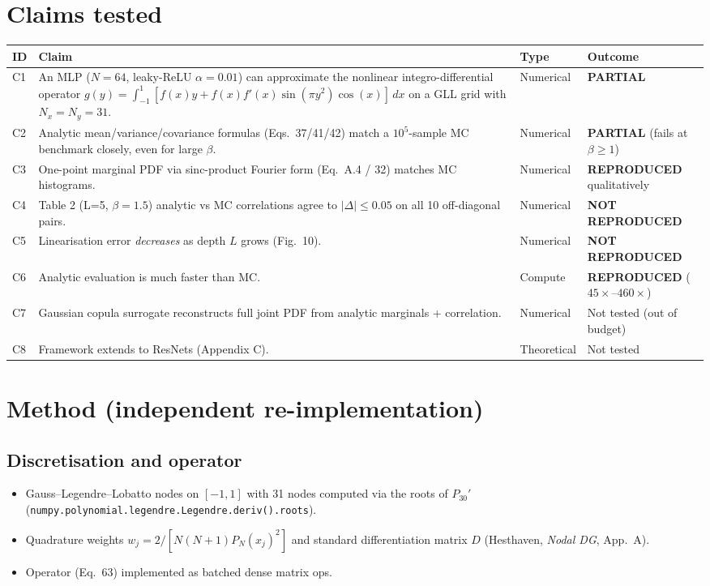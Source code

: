 \documentclass[11pt]{article}
\begin{document}
\section{Claims tested}
\begin{longtable}{p{0.7cm} p{9.5cm} p{2.1cm} p{2.4cm}}
\toprule
ID & Claim & Type & Outcome \\
\midrule
C1 & An MLP ($N{=}64$, leaky-ReLU $\alpha{=}0.01$) can approximate the nonlinear integro-differential operator $g(y) = \int_{-1}^{1}[f(x)y + f(x)f'(x)\sin(\pi y^2)\cos(x)]\,dx$ on a GLL grid with $N_x{=}N_y{=}31$. & Numerical & \textbf{PARTIAL} \\
C2 & Analytic mean/variance/covariance formulas (Eqs.\ 37/41/42) match a $10^5$-sample MC benchmark closely, even for large $\beta$. & Numerical & \textbf{PARTIAL} (fails at $\beta \ge 1$) \\
C3 & One-point marginal PDF via sinc-product Fourier form (Eq.\ A.4 / 32) matches MC histograms. & Numerical & \textbf{REPRODUCED} qualitatively \\
C4 & Table 2 (L=5, $\beta{=}1.5$) analytic vs MC correlations agree to $|\Delta|\le 0.05$ on all 10 off-diagonal pairs. & Numerical & \textbf{NOT REPRODUCED} \\
C5 & Linearisation error \emph{decreases} as depth $L$ grows (Fig.\ 10). & Numerical & \textbf{NOT REPRODUCED} \\
C6 & Analytic evaluation is much faster than MC. & Compute & \textbf{REPRODUCED} ($45\times$--$460\times$) \\
C7 & Gaussian copula surrogate reconstructs full joint PDF from analytic marginals + correlation. & Numerical & Not tested (out of budget) \\
C8 & Framework extends to ResNets (Appendix C). & Theoretical & Not tested \\
\bottomrule
\end{longtable}

\section{Method (independent re-implementation)}
\subsection{Discretisation and operator}
\begin{itemize}
  \item Gauss--Legendre--Lobatto nodes on $[-1,1]$ with 31 nodes computed via the roots of $P_{30}'$ (\texttt{numpy.polynomial.legendre.Legendre.deriv().roots}).
  \item Quadrature weights $w_j = 2/[N(N{+}1)P_N(x_j)^2]$ and standard differentiation matrix $D$ (Hesthaven, \emph{Nodal DG}, App.\ A).
  \item Operator (Eq.\ 63) implemented as batched dense matrix ops.
\end{itemize}
\end{document}
